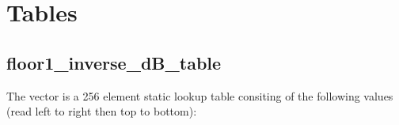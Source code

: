 \section{Tables} \label{vorbis:spec:tables}

\subsection{floor1\_inverse\_dB\_table} \label{vorbis:spec:floor1:inverse:dB:table}

The vector  is a 256 element static
lookup table consiting of the following values (read left to right
then top to bottom):

